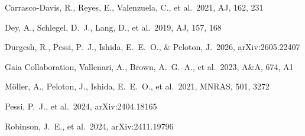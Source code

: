 \documentclass[RNAAS]{aastex701}
\begin{document}
\begin{thebibliography}{}

Carrasco-Davis, R., Reyes, E., Valenzuela, C., et al.\ 2021, AJ, 162, 231

Dey, A., Schlegel, D.~J., Lang, D., et al.\ 2019, AJ, 157, 168

Durgesh, R., Pessi, P.~J., Ishida, E.~E.~O., \& Peloton, J.\ 2026,
arXiv:2605.22407

Gaia Collaboration, Vallenari, A., Brown, A.~G.~A., et al.\ 2023, A\&A, 674, A1

M{\"o}ller, A., Peloton, J., Ishida, E.~E.~O., et al.\ 2021, MNRAS, 501, 3272

Pessi, P.~J., et al.\ 2024, arXiv:2404.18165

Robinson, J.~E., et al.\ 2024, arXiv:2411.19796

\end{thebibliography}
\end{document}
